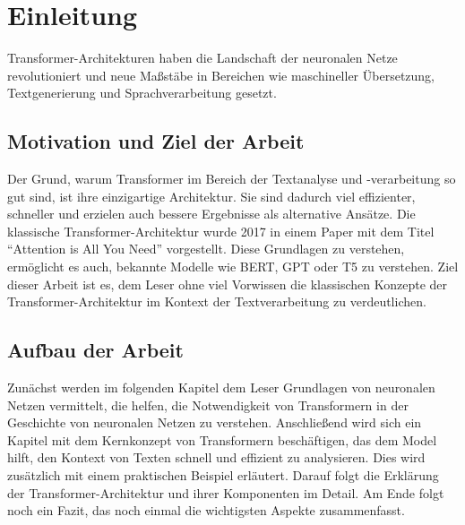 \chapter{Einleitung}

Transformer-Architekturen haben die Landschaft der neuronalen Netze revolutioniert und neue Maßstäbe in Bereichen wie maschineller Übersetzung, Textgenerierung und Sprachverarbeitung gesetzt.  

\section{Motivation und Ziel der Arbeit}

Der Grund, warum Transformer im Bereich der Textanalyse und -verarbeitung so gut sind, ist ihre einzigartige Architektur.  
Sie sind dadurch viel effizienter, schneller und erzielen auch bessere Ergebnisse als alternative Ansätze.  
Die klassische Transformer-Architektur wurde 2017 in einem Paper mit dem Titel \enquote{Attention is All You Need} vorgestellt.  
Diese Grundlagen zu verstehen, ermöglicht es auch, bekannte Modelle wie BERT, GPT oder T5 zu verstehen.  
Ziel dieser Arbeit ist es, dem Leser ohne viel Vorwissen die klassischen Konzepte der Transformer-Architektur im Kontext der Textverarbeitung zu verdeutlichen.  

\section{Aufbau der Arbeit}

Zunächst werden im folgenden Kapitel dem Leser Grundlagen von neuronalen Netzen vermittelt, die helfen, die Notwendigkeit von Transformern in der Geschichte von neuronalen Netzen zu verstehen.  
Anschließend wird sich ein Kapitel mit dem Kernkonzept von Transformern beschäftigen, das dem Model hilft, den Kontext von Texten schnell und effizient zu analysieren.  
Dies wird zusätzlich mit einem praktischen Beispiel erläutert.  
Darauf folgt die Erklärung der Transformer-Architektur und ihrer Komponenten im Detail.  
Am Ende folgt noch ein Fazit, das noch einmal die wichtigsten Aspekte zusammenfasst.  

